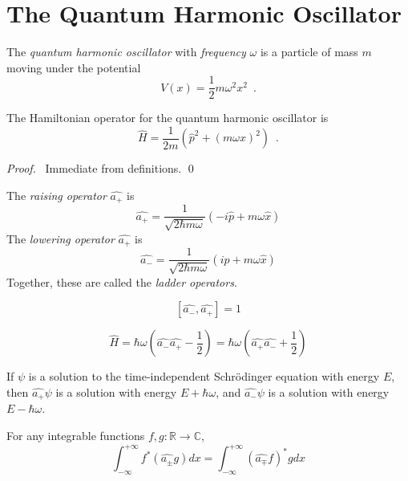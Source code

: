 \section{The Quantum Harmonic Oscillator}

The \emph{quantum harmonic oscillator} with \emph{frequency} $\omega$ is a particle of mass $m$ moving under the potential
\[ V(x) = \frac{1}{2} m \omega^2 x^2 \enspace . \]

\begin{prop}
The Hamiltonian operator for the quantum harmonic oscillator is
\[ \hat{H} = \frac{1}{2m} \left( \hat{p}^2 + (m \omega x)^2 \right) \enspace . \]
\end{prop}

\begin{proof}
\pf\ Immediate from definitions. \qed
\end{proof}

\begin{df}
The \emph{raising operator} $\hat{a_+}$ is
\[ \hat{a_+} = \frac{1}{\sqrt{2 \hbar m \omega}} (- i \hat{p} + m \omega \hat{x}) \]
The \emph{lowering operator} $\hat{a_+}$ is
\[ \hat{a_-} = \frac{1}{\sqrt{2 \hbar m \omega}} (i \hat{p} + m \omega \hat{x}) \]
Together, these are called the \emph{ladder operators}.
\end{df}

\begin{prop}
\[ [\hat{a_-}, \hat{a_+}] = 1 \]
\end{prop}

\begin{prop}
\label{prop:qho_Hamiltonian}
\[ \hat{H} = \hbar \omega (\hat{a_-} \hat{a_+} - \frac{1}{2}) = \hbar \omega (\hat{a_+} \hat{a_-} + \frac{1}{2}) \]
\end{prop}

\begin{prop}
\label{prop:raise_lower}
If $\psi$ is a solution to the time-independent Schr\"{o}dinger equation with energy $E$, then $\hat{a_+} \psi$ is a solution with energy $E + \hbar \omega$, and $\hat{a_-} \psi$ is a solution with energy $E - \hbar \omega$.
\end{prop}

\begin{prop}
\label{prop:Hermitian_conjugates}
For any integrable functions $f,g : \mathbb{R} \rightarrow \mathbb{C}$,
\[ \int_{- \infty}^{+ \infty} f^* (\hat{a_\pm} g) dx = \int_{-\infty}^{+ \infty} (\hat{a_\mp} f)^* g dx \]
\end{prop}

